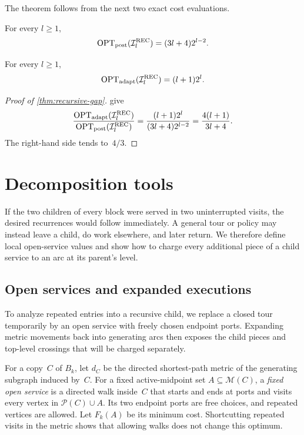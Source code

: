 \documentclass[12pt,a4paper,oneside]{report}
\begin{document}
The theorem follows from the next two exact cost evaluations.

\begin{lemma}\label{lem:post-cost}
For every $l\ge1$,
\[
    \operatorname{OPT}_\mathrm{post}(\mathcal{I}_l^{\mathrm{REC}})=(3l+4)2^{l-2}.
\]
\end{lemma}

\begin{lemma}\label{lem:adapt-cost}
For every $l\ge1$,
\[
    \operatorname{OPT}_\mathrm{adapt}(\mathcal{I}_l^{\mathrm{REC}})=(l+1)2^l.
\]
\end{lemma}

\begin{proof}[Proof of \cref{thm:recursive-gap}]
 give
\[
    \frac{\operatorname{OPT}_\mathrm{adapt}(\mathcal{I}_l^{\mathrm{REC}})}
         {\operatorname{OPT}_\mathrm{post}(\mathcal{I}_l^{\mathrm{REC}})}
    =
    \frac{(l+1)2^l}{(3l+4)2^{l-2}}
    =
    \frac{4(l+1)}{3l+4}.
\]
The right-hand side tends to~$4/3$.
\end{proof}

\section{Decomposition tools}\label{sec:recursive-decomposition}

If the two children of every block were served in two uninterrupted visits,
the desired recurrences would follow immediately.  A general tour or policy
may instead leave a child, do work elsewhere, and later return.  We therefore
define local open-service values and show how to charge every additional
piece of a child service to an arc at its parent's level.

\subsection{Open services and expanded executions}
\label{sec:recursive-open-services}

To analyze repeated entries into a recursive child, we replace a closed tour
temporarily by an open service with freely chosen endpoint ports.  Expanding
metric movements back into generating arcs then exposes the child pieces and
top-level crossings that will be charged separately.

For a copy~$C$ of $B_k$, let $d_C$ be the directed shortest-path metric of
the generating subgraph induced by~$C$.  For a fixed active-midpoint set
$A\subseteq\mathcal M(C)$, a \emph{fixed open service} is a directed walk
inside~$C$ that starts and ends at ports and visits every vertex in
$\mathcal P(C)\cup A$.  Its two endpoint ports are free choices, and repeated
vertices are allowed.  Let $F_k(A)$ be its minimum cost.  Shortcutting repeated
visits in the metric shows that allowing walks does not change this optimum.
\end{document}
